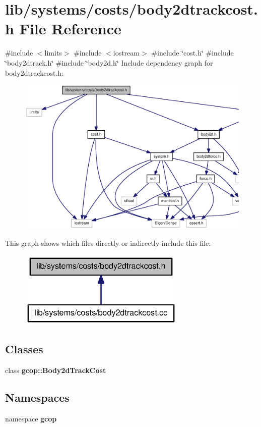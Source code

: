 \section{lib/systems/costs/body2dtrackcost.h \-File \-Reference}
\label{body2dtrackcost_8h}
{\ttfamily \#include $<$limits$>$}\*
{\ttfamily \#include $<$iostream$>$}\*
{\ttfamily \#include \char`\"{}cost.\-h\char`\"{}}\*
{\ttfamily \#include \char`\"{}body2dtrack.\-h\char`\"{}}\*
{\ttfamily \#include \char`\"{}body2d.\-h\char`\"{}}\*
\-Include dependency graph for body2dtrackcost.\-h\-:\nopagebreak
\begin{figure}[H]
\begin{center}
\leavevmode
\includegraphics[width=350pt]{body2dtrackcost_8h__incl}
\end{center}
\end{figure}
\-This graph shows which files directly or indirectly include this file\-:\nopagebreak
\begin{figure}[H]
\begin{center}
\leavevmode
\includegraphics[width=226pt]{body2dtrackcost_8h__dep__incl}
\end{center}
\end{figure}
\subsection*{\-Classes}
\begin{DoxyCompactItemize}
\item 
class {\bf gcop\-::\-Body2d\-Track\-Cost}
\end{DoxyCompactItemize}
\subsection*{\-Namespaces}
\begin{DoxyCompactItemize}
\item 
namespace {\bf gcop}
\end{DoxyCompactItemize}
